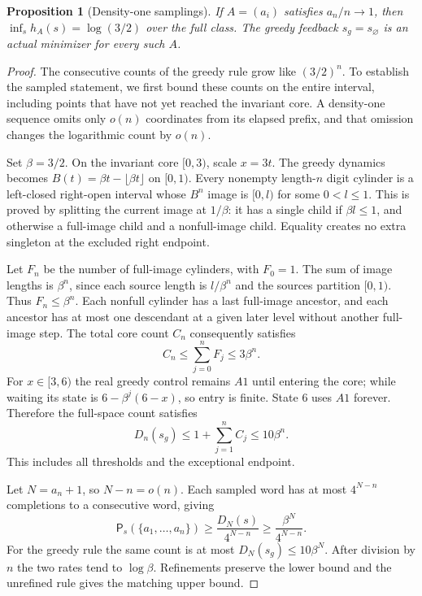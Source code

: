 \documentclass[11pt,reqno]{amsart}
\numberwithin{equation}{section}
\newtheorem{proposition}[theorem]{Proposition}
\theoremstyle{definition}
\theoremstyle{definition}
\newcommand{\Patt}{\mathsf P}
\begin{document}
\begin{proposition}[Density-one samplings]\label{prop:density-one}
If $A=(a_i)$ satisfies $a_n/n\to1$, then
$\inf_s h_A(s)=\log(3/2)$ over the full class.
The greedy feedback $s_g=s_\varnothing$ is an actual minimizer
for every such $A$.
\end{proposition}
\begin{proof}
The consecutive counts of the greedy rule grow like $(3/2)^n$.
To establish the sampled statement, we first bound these counts on
the entire interval, including points that have not yet reached the
invariant core. A density-one sequence omits only $o(n)$ coordinates
from its elapsed prefix, and that omission changes the logarithmic
count by $o(n)$.

Set $\beta=3/2$. On the invariant core $[0,3)$, scale $x=3t$.
The greedy dynamics becomes $B(t)=\beta t-\lfloor\beta t\rfloor$
on $[0,1)$. Every nonempty length-$n$ digit cylinder is a
left-closed right-open interval whose $B^n$ image is $[0,l)$
for some $0<l\le1$. This is proved by splitting the current
image at $1/\beta$: it has a single child if $\beta l\le1$,
and otherwise a full-image child and a nonfull-image child.
Equality creates no extra singleton at the excluded right endpoint.

Let $F_n$ be the number of full-image cylinders, with $F_0=1$.
The sum of image lengths is $\beta^n$, since each source length
is $l/\beta^n$ and the sources partition $[0,1)$. Thus
$F_n\le\beta^n$. Each nonfull cylinder has a last full-image
ancestor, and each ancestor has at most one descendant at a given
later level without another full-image step. The total core count
$C_n$ consequently satisfies
\[
 C_n\le\sum_{j=0}^n F_j\le3\beta^n.
\]
For $x\in[3,6)$ the real greedy control remains $A1$ until
entering the core; while waiting its state is
$6-\beta^j(6-x)$, so entry is finite. State $6$ uses $A1$
forever. Therefore the full-space count satisfies
\[
 D_n(s_g)\le1+\sum_{j=1}^n C_j\le10\beta^n.
\]
This includes all thresholds and the exceptional endpoint.

Let $N=a_n+1$, so $N-n=o(n)$. Each sampled word has at most
$4^{N-n}$ completions to a consecutive word, giving
\[
 \Patt_s(\{a_1,\ldots,a_n\})\ge
 \frac{D_N(s)}{4^{N-n}}\ge\frac{\beta^N}{4^{N-n}}.
\]
For the greedy rule the same count is at most
$D_N(s_g)\le10\beta^N$. After division by $n$ the two
rates tend to $\log\beta$. Refinements preserve the lower
bound and the unrefined rule gives the matching upper bound.
\end{proof}
\end{document}
